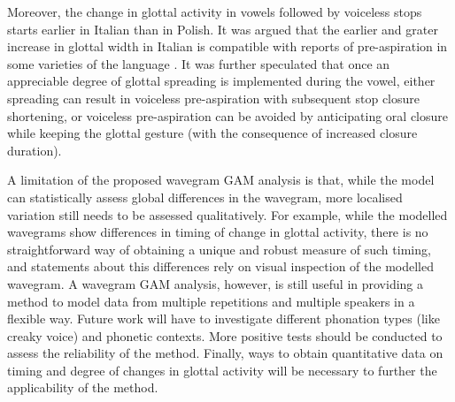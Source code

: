 \documentclass[
  11pt,
  a4paper,
]{article}
\begin{document}
Moreover, the change in glottal activity in vowels followed by voiceless
stops starts earlier in Italian than in Polish. It was argued that the
earlier and grater increase in glottal width in Italian is compatible
with reports of pre-aspiration in some varieties of the language
\citep{ni-chasaide1993, stevens2014a}. It was further speculated that
once an appreciable degree of glottal spreading is implemented during
the vowel, either spreading can result in voiceless pre-aspiration with
subsequent stop closure shortening, or voiceless pre-aspiration can be
avoided by anticipating oral closure while keeping the glottal gesture
(with the consequence of increased closure duration).

A limitation of the proposed wavegram GAM analysis is that, while the
model can statistically assess global differences in the wavegram, more
localised variation still needs to be assessed qualitatively. For
example, while the modelled wavegrams show differences in timing of
change in glottal activity, there is no straightforward way of obtaining
a unique and robust measure of such timing, and statements about this
differences rely on visual inspection of the modelled wavegram. A
wavegram GAM analysis, however, is still useful in providing a method to
model data from multiple repetitions and multiple speakers in a flexible
way. Future work will have to investigate different phonation types
(like creaky voice) and phonetic contexts. More positive tests should be
conducted to assess the reliability of the method. Finally, ways to
obtain quantitative data on timing and degree of changes in glottal
activity will be necessary to further the applicability of the method.

  
\end{document}
